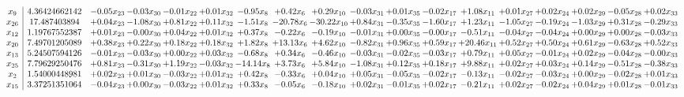 \documentclass[9pt]{article}
\begin{document}
 \[\begin{array}{c| c c@{\hskip 2pt} c@{\hskip 2pt} c@{\hskip 2pt} c@{\hskip 2pt} c@{\hskip 2pt} c@{\hskip 2pt} c@{\hskip 2pt} c@{\hskip 2pt} c@{\hskip 2pt} c@{\hskip 2pt} c@{\hskip 2pt} c@{\hskip 2pt} c@{\hskip 2pt} c@{\hskip 2pt} c@{\hskip 2pt} c@{\hskip 2pt} }
 x_{9}   &  4.36424662142 & -0.05 x_{23} & -0.03 x_{30} & -0.01 x_{22} & +  0.01 x_{32} & -0.95 x_{8} & +  0.42 x_{6} & +  0.29 x_{10} & -0.03 x_{31} & +  0.01 x_{35} & -0.02 x_{17} & +  1.08 x_{11} & +  0.01 x_{27} & +  0.02 x_{24} & +  0.02 x_{29} & -0.05 x_{28} & +  0.02 x_{33}\\
 x_{26}   &  17.487403894 & +  0.04 x_{23} & -1.08 x_{30} & +  0.81 x_{22} & +  0.11 x_{32} & -1.51 x_{8} & -20.78 x_{6} & -30.22 x_{10} & +  0.84 x_{31} & -0.35 x_{35} & -1.60 x_{17} & +  1.23 x_{11} & -1.05 x_{27} & -0.19 x_{24} & -1.03 x_{29} & +  0.31 x_{28} & -0.29 x_{33}\\
 x_{12}   &  1.19767552387 & +  0.01 x_{23} & -0.00 x_{30} & +  0.04 x_{22} & +  0.01 x_{32} & +  0.37 x_{8} & -0.22 x_{6} & -0.19 x_{10} & -0.01 x_{31} & +  0.00 x_{35} & -0.00 x_{17} & -0.51 x_{11} & -0.04 x_{27} & -0.04 x_{24} & +  0.00 x_{29} & +  0.00 x_{28} & -0.03 x_{33}\\
 x_{20}   &  7.49701205089 & +  0.38 x_{23} & +  0.22 x_{30} & +  0.18 x_{22} & +  0.18 x_{32} & +  1.82 x_{8} & + 13.13 x_{6} & +  4.62 x_{10} & -0.82 x_{31} & +  0.96 x_{35} & +  0.59 x_{17} & + 20.46 x_{11} & +  0.52 x_{27} & +  0.50 x_{24} & +  0.61 x_{29} & -0.63 x_{28} & +  0.52 x_{33}\\
 x_{13}   &  5.24507594126 & -0.01 x_{23} & -0.03 x_{30} & +  0.00 x_{22} & +  0.03 x_{32} & -0.68 x_{8} & +  0.34 x_{6} & -0.46 x_{10} & -0.03 x_{31} & -0.02 x_{35} & -0.03 x_{17} & +  0.79 x_{11} & +  0.05 x_{27} & -0.01 x_{24} & +  0.02 x_{29} & -0.04 x_{28} & -0.00 x_{33}\\
 x_{25}   &  7.79629250476 & +  0.81 x_{23} & -0.31 x_{30} & +  1.19 x_{22} & -0.03 x_{32} & -14.14 x_{8} & +  3.73 x_{6} & +  5.84 x_{10} & -1.08 x_{31} & +  0.12 x_{35} & +  0.18 x_{17} & +  9.88 x_{11} & +  0.02 x_{27} & +  0.03 x_{24} & +  0.14 x_{29} & -0.51 x_{28} & -0.38 x_{33}\\
 x_{2}   &  1.54000448981 & +  0.02 x_{23} & +  0.01 x_{30} & -0.03 x_{22} & +  0.01 x_{32} & +  0.42 x_{8} & -0.33 x_{6} & +  0.04 x_{10} & +  0.05 x_{31} & -0.05 x_{35} & -0.02 x_{17} & -0.13 x_{11} & -0.02 x_{27} & -0.03 x_{24} & +  0.00 x_{29} & -0.02 x_{28} & +  0.01 x_{33}\\
 x_{15}   &  3.37251351064 & -0.04 x_{23} & +  0.00 x_{30} & -0.03 x_{22} & +  0.01 x_{32} & +  0.33 x_{8} & -0.05 x_{6} & -0.18 x_{10} & +  0.02 x_{31} & -0.01 x_{35} & +  0.02 x_{17} & -0.21 x_{11} & +  0.02 x_{27} & -0.02 x_{24} & +  0.04 x_{29} & +  0.01 x_{28} & -0.01 x_{33}\\

\end{array}\]
\end{document}
